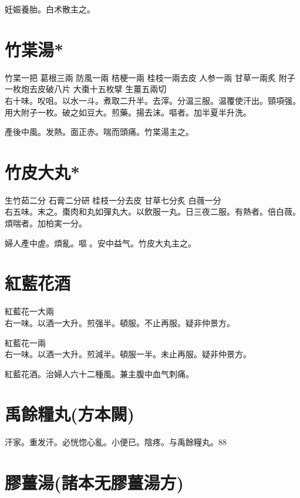 妊娠養胎。白术散主之。

\section{竹枼湯*}

竹枼{\scriptsize 一把} 葛根{\scriptsize 三兩} 防風{\scriptsize 一兩} 桔梗{\scriptsize 一兩} 桂枝{\scriptsize 一兩去皮} 人参{\scriptsize 一兩} 甘草{\scriptsize 一兩炙} 附子{\scriptsize 一枚炮去皮破八片} 大棗{\scriptsize 十五枚擘} 生薑{\scriptsize 五兩切}\\
右十味。㕮咀。以水一斗。煮取二升半。去滓。分温三服。温覆使汗出。頸項强。用大附子一枚。破之如豆大。煎藥。揚去沫。嘔者。加半夏半升洗。

產後中風。发熱。面{\khaaitp 正}赤。喘而頭痛。竹枼湯主之。

\section{竹皮大丸*}

生竹茹{\scriptsize 二分} 石膏{\scriptsize 二分研} 桂枝{\scriptsize 一分去皮} 甘草{\scriptsize 七分炙} 白薇{\scriptsize 一分}\\
右五味。末之。棗肉和丸如彈丸大。以飲服一丸。日三夜二服。有熱者。倍白薇。煩喘者。加柏実一分。

婦人產中虗。煩亂。嘔{\sungtpii 𠱘}。安中益气。竹皮大丸主之。

\section{紅藍花酒}

紅藍花{\scriptsize 一大兩}\\
右一味。以酒一大升。煎强半。頓服。不止再服。{\scriptsize 疑非仲景方。}{\wuben}

紅藍花{\scriptsize 一兩}\\
右一味。以酒一大升。煎減半。頓服一半。未止再服。{\scriptsize 疑非仲景方。}{\dengben}

紅藍花酒。治婦人六十二種風。兼主腹中血气刺痛。

\section{禹餘糧丸{\scriptsize (方本闕)}}

汗家。重发汗。必恍惚心亂。小便已。陰疼。与禹餘糧丸。88

\section{膠薑湯{\scriptsize (諸本无膠薑湯方)}}

